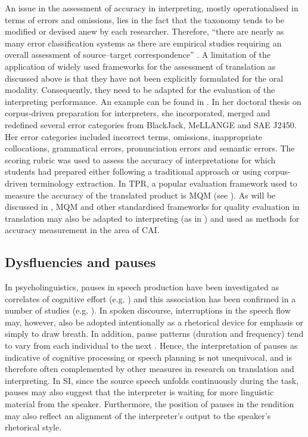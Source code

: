 An issue in the assessment of accuracy in interpreting, mostly operationalised in terms of errors and omissions, lies in the fact that the taxonomy tends to be modified or devised anew by each researcher. Therefore, ``there are nearly as many error classification systems as there are empirical studies requiring an overall assessment of source–target correspondence'' \citep[143]{pochhacker_introducing_2004}. A limitation of the application of widely used frameworks for the assessment of translation as discussed above is that they have not been explicitly formulated for the oral modality. Consequently, they need to be adapted for the evaluation of the interpreting performance. An example can be found in \citet{xu_terminology_2015}. In her doctoral thesis on corpus-driven preparation for interpreters, she incorporated, merged and redefined several error categories from BlackJack, MeLLANGE and SAE J2450. Her error categories included incorrect terms, omissions, inappropriate collocations, grammatical errors, pronunciation errors and semantic errors. The scoring rubric was used to assess the accuracy of interpretations for which students had prepared either following a traditional approach or using corpus-driven terminology extraction. In TPR, a popular evaluation framework used to measure the accuracy of the translated product is MQM (see ). As will be discussed in , MQM and other standardised frameworks for quality evaluation in translation may also be adapted to interpreting (as in \citealt{xu_terminology_2015}) and used as methods for accuracy measurement in the area of CAI.

\subsection{Dysfluencies and pauses} \label{dysfluencies}
In psycholinguistics, pauses in speech production have been investigated as correlates of cognitive effort (e.g. \citealt{goldman-eisler_segmentation_1972}) and this association has been confirmed in a number of studies (e.g. \citealt{dragsted_segmentation_2004,lacruz-etal-2012-average,lacruz_post-editing_2014,kumpulainen_operationalisation_2015}). In spoken discourse, interruptions in the speech flow may, however, also be adopted intentionally as a rhetorical device for emphasis or simply to draw breath. In addition, pause patterns (duration and frequency) tend to vary from each individual to the next \citep{obrien_pauses_2006}. Hence, the interpretation of pauses as indicative of cognitive processing or speech planning is not unequivocal, and is therefore often complemented by other measures in research on translation and interpreting. In SI, since the source speech unfolds continuously during the task, pauses may also suggest that the interpreter is waiting for more linguistic material from the speaker. Furthermore, the position of pauses in the rendition may also reflect an alignment of the interpreter's output to the speaker's rhetorical style.

